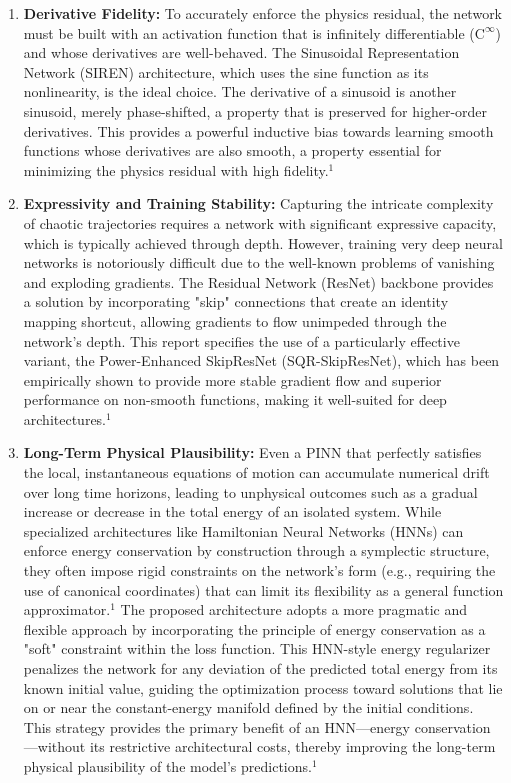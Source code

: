 \begin{enumerate}
    \item \textbf{Derivative Fidelity:} To accurately enforce the physics residual, the network must be built with an activation function that is infinitely differentiable ($\mathrm{C}^\infty$) and whose derivatives are well-behaved. The Sinusoidal Representation Network (SIREN) architecture, which uses the sine function as its nonlinearity, is the ideal choice. The derivative of a sinusoid is another sinusoid, merely phase-shifted, a property that is preserved for higher-order derivatives. This provides a powerful inductive bias towards learning smooth functions whose derivatives are also smooth, a property essential for minimizing the physics residual with high fidelity.$^1$
    \item \textbf{Expressivity and Training Stability:} Capturing the intricate complexity of chaotic trajectories requires a network with significant expressive capacity, which is typically achieved through depth. However, training very deep neural networks is notoriously difficult due to the well-known problems of vanishing and exploding gradients. The Residual Network (ResNet) backbone provides a solution by incorporating "skip" connections that create an identity mapping shortcut, allowing gradients to flow unimpeded through the network's depth. This report specifies the use of a particularly effective variant, the Power-Enhanced SkipResNet (SQR-SkipResNet), which has been empirically shown to provide more stable gradient flow and superior performance on non-smooth functions, making it well-suited for deep architectures.$^1$
    \item \textbf{Long-Term Physical Plausibility:} Even a PINN that perfectly satisfies the local, instantaneous equations of motion can accumulate numerical drift over long time horizons, leading to unphysical outcomes such as a gradual increase or decrease in the total energy of an isolated system. While specialized architectures like Hamiltonian Neural Networks (HNNs) can enforce energy conservation by construction through a symplectic structure, they often impose rigid constraints on the network's form (e.g., requiring the use of canonical coordinates) that can limit its flexibility as a general function approximator.$^1$ The proposed architecture adopts a more pragmatic and flexible approach by incorporating the principle of energy conservation as a "soft" constraint within the loss function. This HNN-style energy regularizer penalizes the network for any deviation of the predicted total energy from its known initial value, guiding the optimization process toward solutions that lie on or near the constant-energy manifold defined by the initial conditions. This strategy provides the primary benefit of an HNN—energy conservation—without its restrictive architectural costs, thereby improving the long-term physical plausibility of the model's predictions.$^1$
\end{enumerate}

